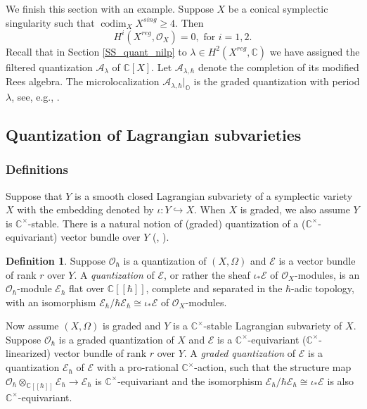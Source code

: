 \documentclass[12pt]{amsart}
\newcommand{\C}{\mathbb{C}}
\newcommand{\A}{\mathcal{A}}
\newcommand{\Orb}{\mathbb{O}}
\newcommand{\cm}{\C^\times}
\newcommand{\OO}{\mathcal{O}}
\newcommand{\EE}{\mathcal{E}}
\theoremstyle{definition}
\newtheorem{defi}[Thm]{Definition}
\numberwithin{equation}{section}
\begin{document}
We finish this section with an example. Suppose $X$ be  a conical symplectic singularity
such that $\operatorname{codim}_X X^{sing}\geqslant 4$. Then
\begin{equation}\label{eq:orbit_coh_cohom_vanish}
H^i(X^{reg},\mathcal{O}_X)=0, \text{ for }i=1,2.
\end{equation}
Recall that in Section \ref{SS_quant_nilp} to $\lambda\in H^2(X^{reg},\C)$
we have assigned the filtered quantization $\A_\lambda$ of $\C[X]$. Let $\A_{\lambda,\hbar}$ denote
the completion of its modified Rees algebra. The microlocalization
$\A_{\lambda,\hbar}|_{\Orb}$ is the graded quantization with period $\lambda$,
see, e.g., \cite[Section 3.2]{orbit}.

\subsection{Quantization of Lagrangian subvarieties} \label{subsec:quan_lag}

\subsubsection{Definitions}

Suppose that $Y$ is a smooth closed Lagrangian subvariety of a symplectic variety $X$ with the embedding denoted by $\iota : Y \hookrightarrow X$. When $X$ is graded, we also assume $Y$ is $\cm$-stable. There is a natural notion of (graded) quantization of a ($\cm$-equivariant) vector bundle over $Y$ (\cite[Section 1]{BC}, \cite[Section 4.3]{LY}).

\begin{defi}
	Suppose $\OO_\hbar$ is a quantization of $(X,\Omega)$ and $\EE$ is a vector bundle of rank $r$  over $Y$. A {\it quantization} of $\EE$, or rather the sheaf $\iota_* \EE$ of $\OO_X$-modules, is an $\OO_\hbar$-module $\EE_\hbar$ flat over $\C[[\hbar]]$, complete and separated in the $\hbar$-adic topology, with an isomorphism $\EE_\hbar /\hbar \EE_\hbar \cong \iota_*\EE$ of $\OO_X$-modules.
	
	Now assume $(X,\Omega)$ is graded and $Y$ is a $\cm$-stable Lagrangian subvariety of $X$. Suppose $\OO_\hbar$ is a graded quantization of $X$ and $\EE$ is a $\cm$-equivariant ($\cm$-linearized) vector bundle of rank $r$ over $Y$. A {\it graded quantization} of $\EE$ is a quantization $\EE_\hbar$ of $\EE$ with a pro-rational $\cm$-action, such that the structure map $\OO_\hbar \otimes_{\C[[\hbar]]} \EE_\hbar \to \EE_\hbar$ is $\cm$-equivariant and the isomorphism $\EE_\hbar /\hbar \EE_\hbar \cong \iota_*\EE$ is also $\cm$-equivariant.
\end{defi}
\end{document}
